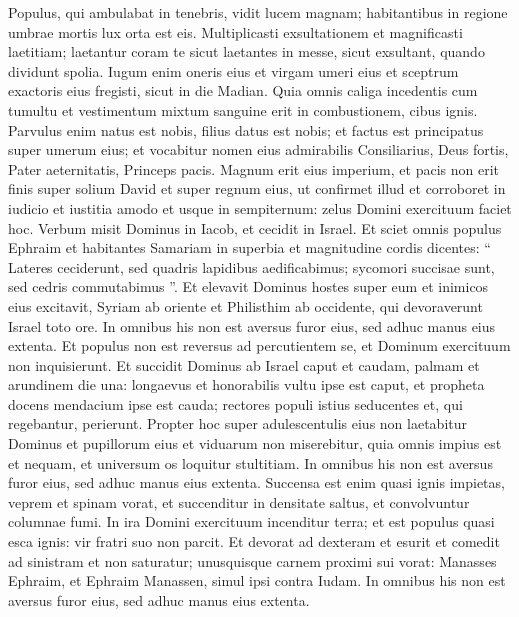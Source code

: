\begin{biblechapter}
\begin{biblechapter}
\begin{biblechapter}
\begin{biblechapter}
\begin{biblechapter}
\begin{biblechapter}
\begin{biblechapter}
\begin{biblechapter}
\begin{biblechapter}
\verse Populus, qui ambulabat in tenebris,
 vidit lucem magnam;
 habitantibus in regione umbrae mortis
 lux orta est eis.
 \verse Multiplicasti exsultationem
 et magnificasti laetitiam;
 laetantur coram te
 sicut laetantes in messe,
 sicut exsultant, quando dividunt spolia.
 \verse Iugum enim oneris eius
 et virgam umeri eius
 et sceptrum exactoris eius
 fregisti, sicut in die Madian.
 \verse Quia omnis caliga incedentis cum tumultu
 et vestimentum mixtum sanguine
 erit in combustionem, cibus ignis.
 \verse Parvulus enim natus est nobis,
 filius datus est nobis;
 et factus est principatus super umerum eius;
 et vocabitur nomen eius
 admirabilis Consiliarius, Deus fortis,
 Pater aeternitatis, Princeps pacis.
 \verse Magnum erit eius imperium,
 et pacis non erit finis
 super solium David et super regnum eius,
 ut confirmet illud et corroboret in iudicio et iustitia
 amodo et usque in sempiternum:
 zelus Domini exercituum faciet hoc.
 \verse Verbum misit Dominus in Iacob, et cecidit in Israel.
 \verse Et sciet omnis populus Ephraim et habitantes Samariam
 in superbia et magnitudine cordis dicentes:
 \verse “ Lateres ceciderunt, sed quadris lapidibus aedificabimus;
 sycomori succisae sunt, sed cedris commutabimus ”.
 \verse Et elevavit Dominus hostes super eum
 et inimicos eius excitavit,
 \verse Syriam ab oriente et Philisthim ab occidente,
 qui devoraverunt Israel toto ore.
 In omnibus his non est aversus furor eius,
 sed adhuc manus eius extenta.
 \verse Et populus non est reversus ad percutientem se,
 et Dominum exercituum non inquisierunt.
 \verse Et succidit Dominus ab Israel caput et caudam,
 palmam et arundinem die una:
 \verse longaevus et honorabilis vultu ipse est caput,
 et propheta docens mendacium ipse est cauda;
 \verse rectores populi istius seducentes
 et, qui regebantur, perierunt.
 \verse Propter hoc super adulescentulis eius non laetabitur Dominus
 et pupillorum eius et viduarum non miserebitur,
 quia omnis impius est et nequam,
 et universum os loquitur stultitiam.
 In omnibus his non est aversus furor eius,
 sed adhuc manus eius extenta.
 \verse Succensa est enim quasi ignis impietas,
 veprem et spinam vorat,
 et succenditur in densitate saltus,
 et convolvuntur columnae fumi.
 \verse In ira Domini exercituum incenditur terra;
 et est populus quasi esca ignis:
 vir fratri suo non parcit.
 \verse Et devorat ad dexteram et esurit
 et comedit ad sinistram et non saturatur;
 unusquisque carnem proximi sui vorat:
 \verse Manasses Ephraim, et Ephraim Manassen,
 simul ipsi contra Iudam.
 In omnibus his non est aversus furor eius,
 sed adhuc manus eius extenta.
 

\end{biblechapter}
\end{biblechapter}
\end{biblechapter}
\end{biblechapter}
\end{biblechapter}
\end{biblechapter}
\end{biblechapter}
\end{biblechapter}
\end{biblechapter}
